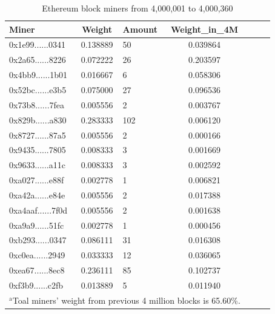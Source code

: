 \documentclass[conference]{IEEEtran}
\begin{document}
\begin{table}[htbp]
\caption{Ethereum block miners from 4,000,001 to 4,000,360}
\begin{center}
\begin{tabular}{lclclcl}
\hline
Miner                                      & Weight   & Amount & Weight\_in\_4M \\
\hline
0x1e99......0341 & 0.138889 & 50     & 0.039864       \\
0x2a65......8226 & 0.072222 & 26     & 0.203597       \\
0x4bb9......1b01 & 0.016667 & 6      & 0.058306       \\
0x52bc......e3b5 & 0.075000 & 27     & 0.096536       \\
0x73b8......7fea & 0.005556 & 2      & 0.003767       \\
0x829b......a830 & 0.283333 & 102    & 0.006120       \\
0x8727......87a5 & 0.005556 & 2      & 0.000166       \\
0x9435......7805 & 0.008333 & 3      & 0.001669       \\
0x9633......a11c & 0.008333 & 3      & 0.002592       \\
0xa027......e88f & 0.002778 & 1      & 0.006821       \\
0xa42a......e84e & 0.005556 & 2      & 0.017388       \\
0xa4aaf......7f0d & 0.005556 & 2      & 0.001638       \\
0xa9a9......51fc & 0.002778 & 1      & 0.000456       \\
0xb293......0347 & 0.086111 & 31     & 0.016308       \\
0xc0ea......2949 & 0.033333 & 12     & 0.036065       \\
0xea67......8ec8 & 0.236111 & 85     & 0.102737       \\
0xf3b9......c2fb & 0.013889 & 5      & 0.011940      \\
\hline
\multicolumn{4}{l}{$^{\mathrm{a}}$Toal miners' weight from previous 4 million blocks is 65.60\%.}
\end{tabular}
\end{center}
\end{table}
\end{document}
